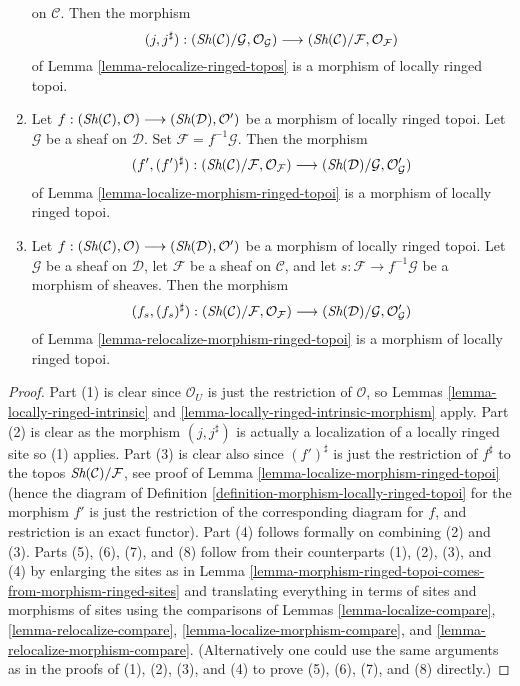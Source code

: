 \begin{lemma}
\begin{enumerate}
on $\mathcal{C}$. Then the morphism
$$
(j, j^\sharp) :
(\mathop{\textit{Sh}}\nolimits(\mathcal{C})/\mathcal{G}, \mathcal{O}_\mathcal{G})
\longrightarrow
(\mathop{\textit{Sh}}\nolimits(\mathcal{C})/\mathcal{F}, \mathcal{O}_\mathcal{F})
$$
of
Lemma \ref{lemma-relocalize-ringed-topos}
is a morphism of locally ringed topoi.
\item Let
$f :
(\mathop{\textit{Sh}}\nolimits(\mathcal{C}), \mathcal{O})
\longrightarrow
(\mathop{\textit{Sh}}\nolimits(\mathcal{D}), \mathcal{O}')$
be a morphism of locally ringed topoi. Let $\mathcal{G}$ be a sheaf
on $\mathcal{D}$. Set $\mathcal{F} = f^{-1}\mathcal{G}$.
Then the morphism
$$
(f', (f')^\sharp) :
(\mathop{\textit{Sh}}\nolimits(\mathcal{C})/\mathcal{F}, \mathcal{O}_\mathcal{F})
\longrightarrow
(\mathop{\textit{Sh}}\nolimits(\mathcal{D})/\mathcal{G}, \mathcal{O}'_\mathcal{G})
$$
of
Lemma \ref{lemma-localize-morphism-ringed-topoi}
is a morphism of locally ringed topoi.
\item  Let
$f :
(\mathop{\textit{Sh}}\nolimits(\mathcal{C}), \mathcal{O})
\longrightarrow
(\mathop{\textit{Sh}}\nolimits(\mathcal{D}), \mathcal{O}')$
be a morphism of locally ringed topoi. Let $\mathcal{G}$ be a sheaf
on $\mathcal{D}$, let $\mathcal{F}$ be a sheaf on $\mathcal{C}$, and
let $s : \mathcal{F} \to f^{-1}\mathcal{G}$ be a morphism of sheaves.
Then the morphism
$$
(f_s, (f_s)^\sharp) :
(\mathop{\textit{Sh}}\nolimits(\mathcal{C})/\mathcal{F}, \mathcal{O}_\mathcal{F})
\longrightarrow
(\mathop{\textit{Sh}}\nolimits(\mathcal{D})/\mathcal{G}, \mathcal{O}'_\mathcal{G})
$$
of
Lemma \ref{lemma-relocalize-morphism-ringed-topoi}
is a morphism of locally ringed topoi.
\end{enumerate}
\end{lemma}

\begin{proof}
Part (1) is clear since $\mathcal{O}_U$ is just the
restriction of $\mathcal{O}$, so
Lemmas \ref{lemma-locally-ringed-intrinsic} and
\ref{lemma-locally-ringed-intrinsic-morphism}
apply. Part (2) is clear as the morphism $(j, j^\sharp)$
is actually a localization of a locally ringed site so (1) applies.
Part (3) is clear also since $(f')^\sharp$ is just the
restriction of $f^\sharp$ to the topos
$\mathop{\textit{Sh}}\nolimits(\mathcal{C})/\mathcal{F}$, see proof of
Lemma \ref{lemma-localize-morphism-ringed-topoi}
(hence the diagram of
Definition \ref{definition-morphism-locally-ringed-topoi}
for the morphism $f'$ is just the restriction of the corresponding
diagram for $f$, and restriction is an exact functor).
Part (4) follows formally on combining (2) and (3).
Parts (5), (6), (7), and (8) follow from their counterparts
(1), (2), (3), and (4) by enlarging the sites as in
Lemma \ref{lemma-morphism-ringed-topoi-comes-from-morphism-ringed-sites}
and translating everything in terms of sites and morphisms of sites using
the comparisons of
Lemmas \ref{lemma-localize-compare},
\ref{lemma-relocalize-compare},
\ref{lemma-localize-morphism-compare}, and
\ref{lemma-relocalize-morphism-compare}.
(Alternatively one could use the same arguments as in the proofs
of (1), (2), (3), and (4) to prove (5), (6), (7), and (8) directly.)
\end{proof}











